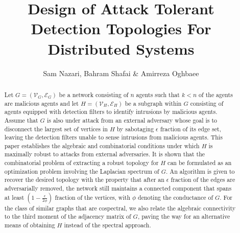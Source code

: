 \documentclass[reqno,8pt]{amsart}
\theoremstyle{definition}
\theoremstyle{remark}
\numberwithin{equation}{section}
\def\cV{\mathcal{V}}
\def\cE{\mathcal{E}}
\begin{document}
\title{Design of Attack Tolerant Detection Topologies For Distributed Systems}

\author{Sam Nazari, Bahram Shafai \& Amirreza Oghbaee}






\begin{abstract}
Let $G=(\cV_G,\cE_G)$ be a network consisting of $n$ agents such that $k < n$ of the agents are malicious agents and let $H=(\cV_H,\cE_H)$ be a subgraph within $G$ consisting of agents equipped with detection filters to identify intrusions by malicious agents. Assume that $G$ is also under attack from an external adversary whose goal is to disconnect the largest set of vertices in $H$ by sabotaging $\epsilon$ fraction of its edge set, leaving the detection filters unable to sense intrusions from malicious agents. This paper establishes the algebraic and combinatorial conditions under which $H$ is maximally robust to attacks from external adversaries.  It is shown that the combinatorial problem of extracting a robust topology for $H$ can be formulated as an optimization problem involving the Laplacian spectrum of $G$. An algorithm is given to recover the desired topology with the property that after an $\epsilon$ fraction of the edges are adversarially removed, the network still maintains a connected component that spans at least $(1-\frac{\epsilon}{2\phi})$ fraction of the vertices, with $\phi$ denoting the conductance of $G$. For the class of similar graphs that are cospectral, we also relate the algebraic connectivity to the third moment of the adjacency matrix of $G$, paving the way for an alternative means of obtaining $H$ instead of the spectral approach. 
\end{abstract}
\end{document}
